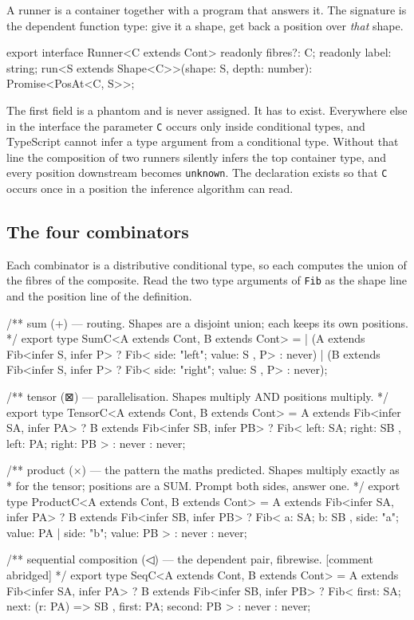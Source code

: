 \documentclass[11pt,a4paper]{article}
\begin{document}
A runner is a container together with a program that answers it. The signature is the
dependent function type: give it a shape, get back a position over \emph{that} shape.

\begin{code}
export interface Runner<C extends Cont> {
  readonly fibres?: C;
  readonly label: string;
  run<S extends Shape<C>>(shape: S, depth: number): Promise<PosAt<C, S>>;
}
\end{code}

The first field is a phantom and is never assigned. It has to exist. Everywhere else
in the interface the parameter \verb|C| occurs only inside conditional types, and
TypeScript cannot infer a type argument from a conditional type. Without that line the
composition of two runners silently infers the top container type, and every position
downstream becomes \verb|unknown|. The declaration exists so that \verb|C| occurs once
in a position the inference algorithm can read.

\subsection{The four combinators}

Each combinator is a distributive conditional type, so each computes the union of the
fibres of the composite. Read the two type arguments of \verb|Fib| as the shape line
and the position line of the definition.

\begin{code}
/** sum (+) — routing. Shapes are a disjoint union; each keeps its own positions. */
export type SumC<A extends Cont, B extends Cont> =
  | (A extends Fib<infer S, infer P> ? Fib<{ side: "left"; value: S }, P> : never)
  | (B extends Fib<infer S, infer P> ? Fib<{ side: "right"; value: S }, P> : never);

/** tensor (⊠) — parallelisation. Shapes multiply AND positions multiply. */
export type TensorC<A extends Cont, B extends Cont> =
  A extends Fib<infer SA, infer PA>
    ? B extends Fib<infer SB, infer PB>
      ? Fib<{ left: SA; right: SB }, { left: PA; right: PB }>
      : never
    : never;

/** product (×) — the pattern the maths predicted. Shapes multiply exactly as
 *  for the tensor; positions are a SUM. Prompt both sides, answer one. */
export type ProductC<A extends Cont, B extends Cont> =
  A extends Fib<infer SA, infer PA>
    ? B extends Fib<infer SB, infer PB>
      ? Fib<{ a: SA; b: SB }, { side: "a"; value: PA } | { side: "b"; value: PB }>
      : never
    : never;

/** sequential composition (◁) — the dependent pair, fibrewise. [comment abridged] */
export type SeqC<A extends Cont, B extends Cont> =
  A extends Fib<infer SA, infer PA>
    ? B extends Fib<infer SB, infer PB>
      ? Fib<{ first: SA; next: (r: PA) => SB }, { first: PA; second: PB }>
      : never
    : never;
\end{code}
\end{document}
